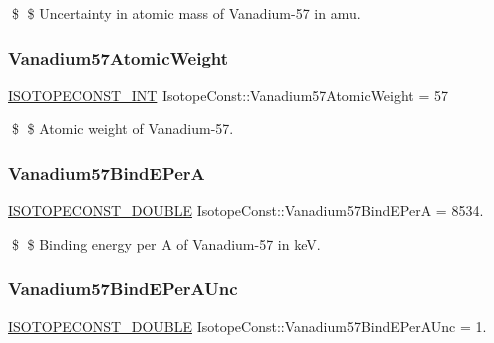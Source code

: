 \$ \$ Uncertainty in atomic mass of Vanadium-\/57 in amu. \mbox{\label{group___isotope_const-_vanadium-_v57_ga131928e244695ea7781b13c09f7acfd3}} 
\subsubsection{\texorpdfstring{Vanadium57\+Atomic\+Weight}{Vanadium57AtomicWeight}}
{\footnotesize\ttfamily \mbox{\hyperlink{group___isotope_const-_macros_ga5f18360b3e99483a35c32d789e62621c}{I\+S\+O\+T\+O\+P\+E\+C\+O\+N\+S\+T\+\_\+\+I\+NT}} Isotope\+Const\+::\+Vanadium57\+Atomic\+Weight = 57}

\$ \$ Atomic weight of Vanadium-\/57. \mbox{\label{group___isotope_const-_vanadium-_v57_ga210fa7af80eb5b9bbc7b786e0f033da8}} 
\subsubsection{\texorpdfstring{Vanadium57\+Bind\+E\+PerA}{Vanadium57BindEPerA}}
{\footnotesize\ttfamily \mbox{\hyperlink{group___isotope_const-_macros_ga8f45a7272ce02c0b4c65c44636ed719a}{I\+S\+O\+T\+O\+P\+E\+C\+O\+N\+S\+T\+\_\+\+D\+O\+U\+B\+LE}} Isotope\+Const\+::\+Vanadium57\+Bind\+E\+PerA = 8534.}

\$ \$ Binding energy per A of Vanadium-\/57 in keV. \mbox{\label{group___isotope_const-_vanadium-_v57_ga29dd8a64d0bf69bcb8780cb585187462}} 
\subsubsection{\texorpdfstring{Vanadium57\+Bind\+E\+Per\+A\+Unc}{Vanadium57BindEPerAUnc}}
{\footnotesize\ttfamily \mbox{\hyperlink{group___isotope_const-_macros_ga8f45a7272ce02c0b4c65c44636ed719a}{I\+S\+O\+T\+O\+P\+E\+C\+O\+N\+S\+T\+\_\+\+D\+O\+U\+B\+LE}} Isotope\+Const\+::\+Vanadium57\+Bind\+E\+Per\+A\+Unc = 1.}

